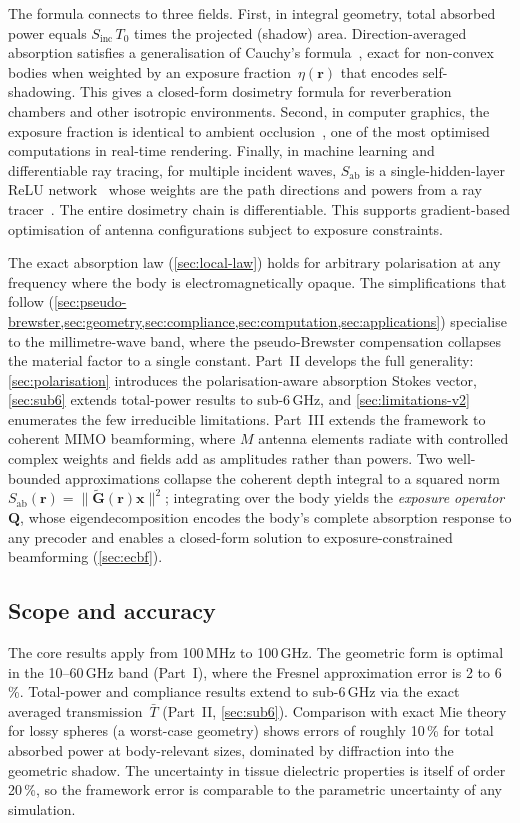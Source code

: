 \documentclass[11pt,a4paper]{article}
\theoremstyle{definition}      %
\newcommand{\rr}{\mathbf{r}}
\newcommand{\Sinc}{S_{\mathrm{inc}}}
\newcommand{\Sab}{S_{\mathrm{ab}}}
\newcommand{\Tbar}{\bar{T}}
\begin{document}
The formula connects to three fields.
First, in integral geometry, total absorbed power equals
$\Sinc\,T_0$ times the projected (shadow) area.
Direction-averaged absorption satisfies a generalisation of
Cauchy's formula~\cite{Cauchy1841,Hadwiger1957}, exact for non-convex
bodies when weighted by an exposure fraction~$\eta(\rr)$ that encodes
self-shadowing.  This gives a closed-form dosimetry formula for
reverberation chambers and other isotropic environments.
Second, in computer graphics, the exposure fraction is
identical to ambient occlusion~\cite{Zhukov1998}, one of the
most optimised computations in real-time rendering.
Finally, in machine learning and differentiable ray tracing,
for multiple incident waves, $\Sab$ is a single-hidden-layer
ReLU network~\cite{NairHinton2010} whose weights are the path
directions and powers from a ray
tracer~\cite{SionnaRT}.  The entire dosimetry chain is differentiable.
This supports gradient-based optimisation of antenna configurations
subject to exposure constraints.

The exact absorption law (\cref{sec:local-law}) holds for arbitrary
polarisation at any frequency where the body is electromagnetically
opaque.  The simplifications that follow
(\cref{sec:pseudo-brewster,sec:geometry,sec:compliance,sec:computation,sec:applications})
specialise to the millimetre-wave band, where the pseudo-Brewster
compensation collapses the material factor to a single constant.
Part~II develops the full generality:
\cref{sec:polarisation} introduces the polarisation-aware absorption
Stokes vector, \cref{sec:sub6} extends total-power results to
sub-6\,GHz, and \cref{sec:limitations-v2} enumerates the few
irreducible limitations.
Part~III extends the framework to coherent MIMO beamforming, where $M$
antenna elements radiate with controlled complex weights and fields add
as amplitudes rather than powers.  Two well-bounded approximations
collapse the coherent depth integral to a squared norm
$\Sab(\rr)=\|\tilde{\mathbf{G}}(\rr)\mathbf{x}\|^2$; integrating over
the body yields the \emph{exposure operator}~$\mathbf{Q}$, whose
eigendecomposition encodes the body's complete absorption response to any
precoder and enables a closed-form solution to exposure-constrained
beamforming (\cref{sec:ecbf}).

\subsection{Scope and accuracy}

The core results apply from 100\,MHz to 100\,GHz.  The geometric
form is optimal in the 10--60\,GHz band (Part~I), where
the Fresnel approximation error is 2 to 6\,\%.  Total-power and
compliance results extend to sub-6\,GHz via the exact averaged
transmission~$\Tbar$ (Part~II, \cref{sec:sub6}).  Comparison with
exact Mie theory for lossy spheres (a worst-case geometry) shows
errors of roughly 10\,\% for total absorbed power at body-relevant
sizes, dominated by diffraction into the geometric shadow.  The
uncertainty in tissue dielectric properties is itself of
order 20\,\%, so the framework error is comparable to the parametric
uncertainty of any simulation.
\end{document}
